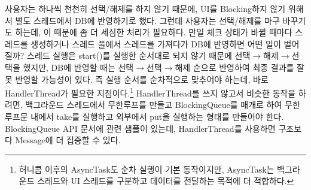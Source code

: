 사용자는 하나씩 천천히 선택/해제를 하지 않기 때문에, UI를 Blocking하지 않기 위해서 별도 스레드에서 DB에 반영하기로 했다.
그런데 사용자는 선택/해제를 마구 바꾸기도 하는데, 이 때문에 좀 더 세심한 처리가 필요하다.
만일 체크 상태가 바뀔 때마다 스레드를 생성하거나 스레드 풀에서 스레드를 가져다가 DB에 반영하면 어떤 일이 벌어질까? 스레드 실행은 start()를 실행한 순서대로 되지 않기 때문에 선택$\rightarrow$해제$\rightarrow$선택을 했지만, DB에 반영할 때는 선택$\rightarrow$선택$\rightarrow$해제 순으로 반영하여 최종 결과를 잘못 반영할 가능성이 있다. 
즉 실행 순서를 순차적으로 맞추어야 하는데, 바로 HandlerThread가 필요한 지점이다.\footnote{허니콤 이후의 AsyncTask도 순차 실행이 기본 동작이지만, AsyncTask는 백그라운드 스레드와 UI 스레드를 구분하고 데이터를 전달하는 목적에 더 적합하다.}
HandlerThread를 쓰지 않고서 비슷한 동작을 하려면, 백그라운드 스레드에서 무한루프를 만들고 BlockingQueue를 매개로 하여 무한루프문 내에서 take를 실행하고 외부에서 put을 실행하는 형태를 만들어야 한다.
BlockingQueue API 문서에 관련 샘플이 있는데, HandlerThread를 사용하면 구조보다 Message에 더 집중할 수 있다.\\

